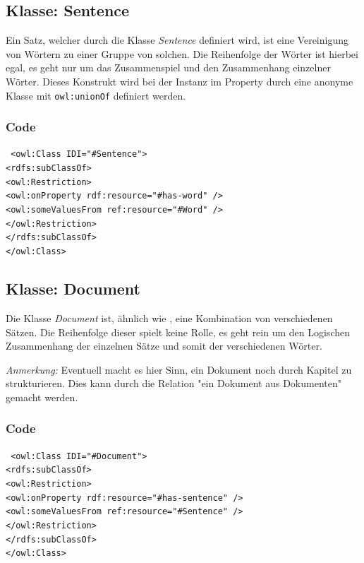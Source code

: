 ﻿\documentclass[
    11pt,
    latin1,
    a4paper,
    oneside
]{scrreprt}
\begin{document}
\subsection{Klasse: Sentence} \label{sec:class_sentence}

Ein Satz, welcher durch die Klasse \emph{Sentence} definiert wird, ist eine Vereinigung von W\"ortern zu einer Gruppe von solchen. Die Reihenfolge der Wörter ist hierbei egal, es geht nur um das Zusammenspiel und den Zusammenhang einzelner Wörter. Dieses Konstrukt wird bei der Instanz im Property  durch eine anonyme Klasse mit \texttt{owl:unionOf} definiert werden.

\subsubsection{Code}  \label{sec:class_sentence_code}

\texttt{ <owl:Class IDI="#Sentence"> \\
	<rdfs:subClassOf> \\
		<owl:Restriction> \\
		<owl:onProperty rdf:resource="#has-word" /> \\
		<owl:someValuesFrom ref:resource="#Word" /> \\
	</owl:Restriction> \\
	</rdfs:subClassOf> \\
</owl:Class> }


\subsection{Klasse: Document} \label{sec:class_document}

Die Klasse \emph{Document} ist, \"ahnlich wie , eine Kombination von verschiedenen S\"atzen. Die Reihenfolge dieser spielt keine Rolle, es geht rein um den Logischen Zusammenhang der einzelnen S\"atze und somit der verschiedenen W\"orter.

\textit{Anmerkung:} Eventuell macht es hier Sinn, ein Dokument noch durch Kapitel zu strukturieren. Dies kann durch die Relation "ein Dokument aus Dokumenten" gemacht werden.

\subsubsection{Code}  \label{sec:class_sentence_code}

\texttt{ <owl:Class IDI="#Document"> \\
	<rdfs:subClassOf> \\
		<owl:Restriction> \\
		<owl:onProperty rdf:resource="#has-sentence" /> \\
		<owl:someValuesFrom ref:resource="#Sentence" /> \\
	</owl:Restriction> \\
	</rdfs:subClassOf> \\
</owl:Class> }
\end{document}
